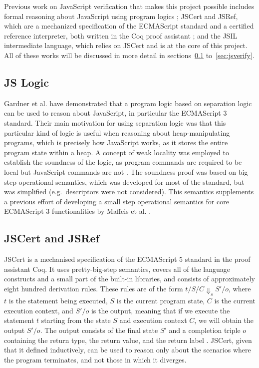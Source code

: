 \documentclass[a4paper,11pt,twoside]{report}
\newif\ifComments
\newcommand{\pmax}[1]{%
\ifComments
\begin{center}
\fbox{%
\begin{minipage}{3in} \color{blue}
{\bf PM:} {\rm #1}
\end{minipage}
}
\end{center}
\fi
}
\begin{document}
\pmax{JavaScript, Internet, widespread, data security, leaks, this and that}

Previous work on JavaScript verification that makes this project possible includes formal reasoning about JavaScript using program logics \cite{Gardner:2012}; JSCert and JSRef, which are a mechanized specification of the ECMAScript standard and a certified reference interpreter, both written in the Coq proof assistant \cite{Bodin:2014}; and the JSIL intermediate language, which relies on JSCert and is at the core of this project. All of these works will be discussed in more detail in sections~\ref{sec:jslogic} to~\ref{sec:jsverify}.

\subsection{JS Logic}\label{sec:jslogic}
Gardner et al. \cite{Gardner:2012} have demonstrated that a program logic based on separation logic can be used to reason about JavaScript, in particular the ECMAScript 3 standard. Their main motivation for using separation logic was that this particular kind of logic is useful when reasoning about heap-manipulating programs, which is precisely how JavaScript works, as it stores the entire program state within a heap. A concept of weak locality was employed to establish the soundness of the logic, as program commands are required to be local but JavaScript commands are not \cite{Gardner:2012}. The soundness proof was based on big step operational semantics, which was developed for most of the standard, but was simplified (e.g.~descriptors were not considered). This semantics supplements a previous effort of developing a small step operational semantics for core ECMAScript 3 functionalities by Maffeis et al. \cite{Maffeis:2008}.

\subsection{JSCert and JSRef}\label{sec:jscert}
JSCert is a mechanised specification of the ECMAScript 5 standard in the proof assistant Coq\cite{Bodin:2014}. It uses pretty-big-step semantics, covers all of the language constructs and a small part of the built-in libraries, and consists of approximately eight hundred derivation rules. These rules are of the form $t/S/C \Downarrow_s S'/o$, where $t$ is the statement being executed, $S$ is the current program state, $C$ is the current execution context, and $S'/o$ is the output, meaning that if we execute the statement $t$ starting from the state $S$ and execution context $C$, we will obtain the output $S'/o$. The output consists of the final state $S'$ and a completion triple $o$ containing the return type, the return value, and the return label \cite{Bodin:2014}. JSCert, given that it defined inductively, can be used to reason only about the scenarios where the program terminates, and not those in which it diverges. 
\end{document}
